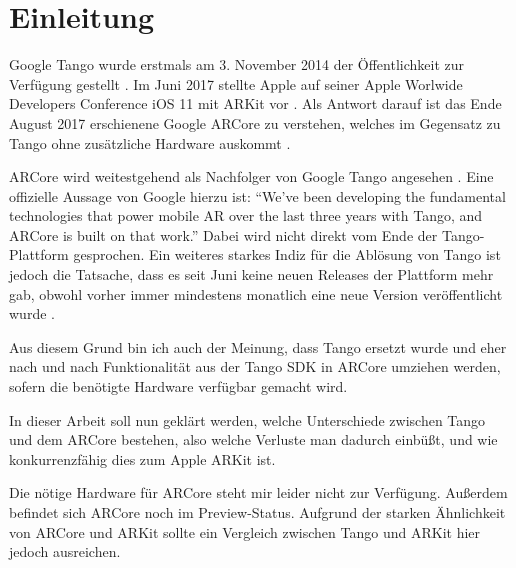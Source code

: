 
\section{Einleitung}

Google Tango wurde erstmals am 3. November 2014 der Öffentlichkeit zur Verfügung gestellt \cite{tango_release_notes}. Im Juni 2017 stellte Apple auf seiner Apple Worlwide Developers Conference iOS 11 mit ARKit vor \cite{ios11_announcement}. Als Antwort darauf ist das Ende August 2017 erschienene Google ARCore zu verstehen, welches im Gegensatz zu Tango ohne zusätzliche Hardware auskommt \cite{arcore_announcement}.

ARCore wird weitestgehend als Nachfolger von Google Tango angesehen \cite{cnet_arcore}\cite{heise_arcore}. Eine offizielle Aussage von Google hierzu ist: "`We’ve been developing the fundamental technologies that power mobile AR over the last three years with Tango, and ARCore is built on that work."'\cite{arcore_announcement} Dabei wird nicht direkt vom Ende der Tango-Plattform gesprochen. Ein weiteres starkes Indiz für die Ablösung von Tango ist jedoch die Tatsache, dass es seit Juni keine neuen Releases der Plattform mehr gab, obwohl vorher immer mindestens monatlich eine neue Version veröffentlicht wurde \cite{tango_release_notes}.

Aus diesem Grund bin ich auch der Meinung, dass Tango ersetzt wurde und eher nach und nach Funktionalität aus der Tango SDK in ARCore umziehen werden, sofern die benötigte Hardware verfügbar gemacht wird.

In dieser Arbeit soll nun geklärt werden, welche Unterschiede zwischen Tango und dem ARCore bestehen, also welche Verluste man dadurch einbüßt, und wie konkurrenzfähig dies zum Apple ARKit ist.

Die nötige Hardware für ARCore steht mir leider nicht zur Verfügung. Außerdem befindet sich ARCore noch im Preview-Status. Aufgrund der starken Ähnlichkeit von ARCore und ARKit sollte ein Vergleich zwischen Tango und ARKit hier jedoch ausreichen.